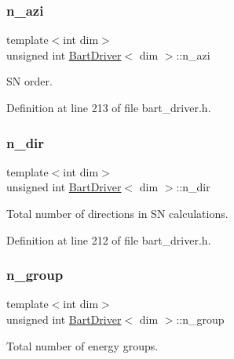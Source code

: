 \subsubsection{\texorpdfstring{n\+\_\+azi}{n\_azi}}
{\footnotesize\ttfamily template$<$int dim$>$ \\
unsigned int \hyperlink{class_bart_driver}{Bart\+Driver}$<$ dim $>$\+::n\+\_\+azi\hspace{0.3cm}{\ttfamily [private]}}



SN order. 



Definition at line 213 of file bart\+\_\+driver.\+h.

\mbox{\label{class_bart_driver_aa1694538581e7941bbda0960bd3c7e39}} 
\subsubsection{\texorpdfstring{n\+\_\+dir}{n\_dir}}
{\footnotesize\ttfamily template$<$int dim$>$ \\
unsigned int \hyperlink{class_bart_driver}{Bart\+Driver}$<$ dim $>$\+::n\+\_\+dir\hspace{0.3cm}{\ttfamily [private]}}



Total number of directions in SN calculations. 



Definition at line 212 of file bart\+\_\+driver.\+h.

\mbox{\label{class_bart_driver_aeb5a04392c80b32379b02e18acbc1126}} 
\subsubsection{\texorpdfstring{n\+\_\+group}{n\_group}}
{\footnotesize\ttfamily template$<$int dim$>$ \\
unsigned int \hyperlink{class_bart_driver}{Bart\+Driver}$<$ dim $>$\+::n\+\_\+group\hspace{0.3cm}{\ttfamily [private]}}



Total number of energy groups. 



